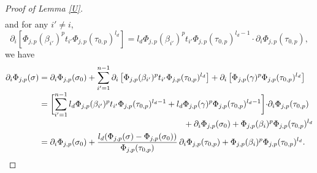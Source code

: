 \begin{proof}[Proof of Lemma \ref{U}]
\begin{multline*}
\end{multline*}
and for any $i'\not=i$,\vspace*{-3pt}
\[
\partial_i[\Phi_{j,p}(\beta_{i'})^p t_{i'} \Phi_{j,p}(\tau_{0,p})^{l_d}]= l_d \Phi_{j,p}(\beta_{i'})^p t_{i'} \Phi_{j,p}(\tau_{0,p})^{l_d-1}\cdot \partial_i \Phi_{j,p}(\tau_{0,p}),
\]
we have\vspace*{-3pt}
\begin{align*}
\partial_i\Phi_{j,p}(\sigma) &= \partial_i \Phi_{j,p}(\sigma_0)+\sum_{i'=1}^{n-1} \partial_i\left[\Phi_{j,p}(\beta_{i'})^p t_{i'}\Phi_{j,p}(\tau_{0,p})^{l_d}\right]+\partial_i\left[\Phi_{j,p}(\gamma)^p\Phi_{j,p}(\tau_{0,p})^{l_d}\right]\\[-3pt]
&= \biggl[ \sum_{i'=1}^{n-1} l_d\Phi_{j,p}(\beta_{i'})^p t_{i'}\Phi_{j,p}(\tau_{0,p})^{l_d-1}+l_d \Phi_{j,p}(\gamma)^p\Phi_{j,p}(\tau_{0,p})^{l_d-1} \biggr]{\cdot} \partial_i \Phi_{j,p}(\tau_{0,p})\\[-2pt]
& \hspace*{6.1cm}+\partial_i\Phi_{j,p}(\sigma_0)+\Phi_{j,p}(\beta_i)^p\Phi_{j,p}(\tau_{0,p})^{l_d} \\
&= \partial_i\Phi_{j,p}(\sigma_0)+ \frac{l_d(\Phi_{j,p}(\sigma)-\Phi_{j,p}(\sigma_0))}{\Phi_{j,p}(\tau_{0,p})}\,\partial_i\Phi_{j,p}(\tau_{0,p})+ \Phi_{j,p}(\beta_i)^p \Phi_{j,p}(\tau_{0,p})^{l_d}.
\end{align*}


\end{proof}
